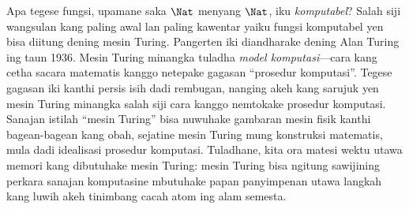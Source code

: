 \documentclass[../../../include/open-logic-section]{subfiles}
\begin{document}

Apa tegese fungsi, upamane saka $\Nat$ menyang $\Nat$,
iku \emph{komputabel}? Salah siji wangsulan kang paling
awal lan paling kawentar yaiku fungsi komputabel yen bisa
diitung dening mesin Turing. Pangerten iki diandharake
dening Alan Turing ing taun 1936. Mesin Turing minangka
tuladha \emph{model komputasi}---cara kang cetha sacara
matematis kanggo netepake gagasan ``prosedur komputasi''.
Tegese gagasan iki kanthi persis isih dadi rembugan,
nanging akeh kang sarujuk yen mesin Turing minangka
salah siji cara kanggo nemtokake prosedur komputasi.
Sanajan istilah ``mesin Turing'' bisa nuwuhake gambaran
mesin fisik kanthi bagean-bagean kang obah, sejatine
mesin Turing mung konstruksi matematis, mula dadi
idealisasi prosedur komputasi. Tuladhane, kita ora
matesi wektu utawa memori kang dibutuhake mesin Turing:
mesin Turing bisa ngitung sawijining perkara sanajan
komputasine mbutuhake papan panyimpenan utawa langkah
kang luwih akeh tinimbang cacah atom ing alam semesta.
\end{document}
